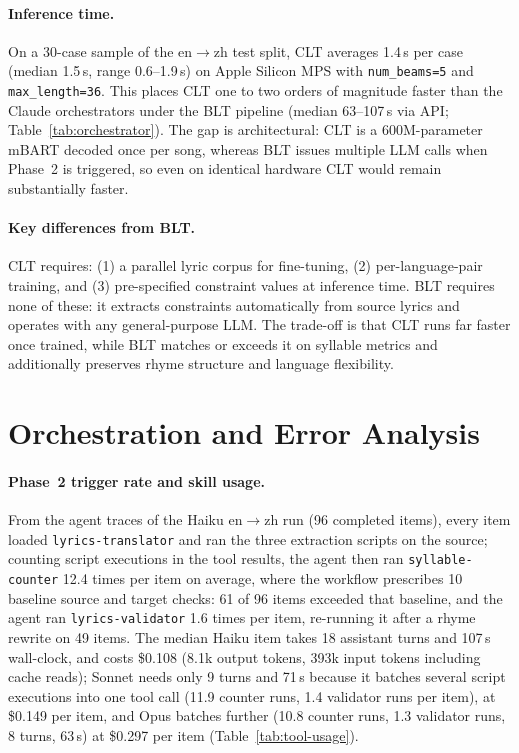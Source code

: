 \documentclass[11pt]{article}
\begin{document}
\paragraph{Inference time.}
On a 30-case sample of the en$\rightarrow$zh test split, CLT averages 1.4\,s per case (median 1.5\,s, range 0.6--1.9\,s) on Apple Silicon MPS with \texttt{num\_beams=5} and \texttt{max\_length=36}.
This places CLT one to two orders of magnitude faster than the Claude orchestrators under the BLT pipeline (median 63--107\,s via API; Table~\ref{tab:orchestrator}).
The gap is architectural: CLT is a 600M-parameter mBART decoded once per song, whereas BLT issues multiple LLM calls when Phase~2 is triggered, so even on identical hardware CLT would remain substantially faster.

\paragraph{Key differences from BLT.}
CLT requires: (1) a parallel lyric corpus for fine-tuning, (2) per-language-pair training, and (3) pre-specified constraint values at inference time.
BLT requires none of these: it extracts constraints automatically from source lyrics and operates with any general-purpose LLM.
The trade-off is that CLT runs far faster once trained, while BLT matches or exceeds it on syllable metrics and additionally preserves rhyme structure and language flexibility.

\section{Orchestration and Error Analysis}
\label{app:analysis}

\paragraph{Phase~2 trigger rate and skill usage.}
From the agent traces of the Haiku en$\rightarrow$zh run (96 completed items), every item loaded \texttt{lyrics-translator} and ran the three extraction scripts on the source; counting script executions in the tool results, the agent then ran \texttt{syllable-counter} 12.4 times per item on average, where the workflow prescribes 10 baseline source and target checks: 61 of 96 items exceeded that baseline, and the agent ran \texttt{lyrics-validator} 1.6 times per item, re-running it after a rhyme rewrite on 49 items.
The median Haiku item takes 18 assistant turns and 107\,s wall-clock, and costs \$0.108 (8.1k output tokens, 393k input tokens including cache reads); Sonnet needs only 9 turns and 71\,s because it batches several script executions into one tool call (11.9 counter runs, 1.4 validator runs per item), at \$0.149 per item, and Opus batches further (10.8 counter runs, 1.3 validator runs, 8 turns, 63\,s) at \$0.297 per item (Table~\ref{tab:tool-usage}).
\end{document}
